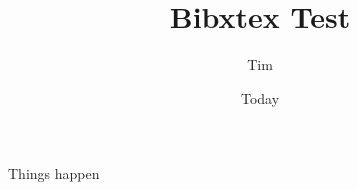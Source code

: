 \documentclass[11pt]{article}
\begin{document}
\title{Bibxtex Test}
\author{Tim}
\date{Today}
\maketitle

Things happen \cite{Duguay2003}

{}
\end{document}
